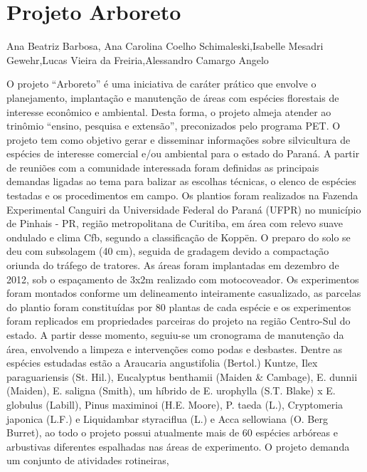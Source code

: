 


\section*{Projeto Arboreto}

Ana Beatriz Barbosa, Ana Carolina Coelho Schimaleski,Isabelle Mesadri Gewehr,Lucas Vieira da Freiria,Alessandro Camargo Angelo

O projeto “Arboreto” é uma iniciativa de caráter prático que envolve o planejamento,
implantação e manutenção de áreas com espécies florestais de interesse econômico e ambiental.
Desta forma, o projeto almeja atender ao trinômio “ensino, pesquisa e extensão”, preconizados
pelo programa PET. O projeto tem como objetivo gerar e disseminar informações sobre
silvicultura de espécies de interesse comercial e/ou ambiental para o estado do Paraná. A partir
de reuniões com a comunidade interessada foram definidas as principais demandas ligadas ao
tema para balizar as escolhas técnicas, o elenco de espécies testadas e os procedimentos em
campo. Os plantios foram realizados na Fazenda Experimental Canguiri da Universidade Federal
do Paraná (UFPR) no município de Pinhais - PR, região metropolitana de Curitiba, em área com
relevo suave ondulado e clima Cfb, segundo a classificação de Koppën. O preparo do solo se deu
com subsolagem (40 cm), seguida de gradagem devido a compactação oriunda do tráfego de
tratores. As áreas foram implantadas em dezembro de 2012, sob o espaçamento de 3x2m
realizado com motocoveador. Os experimentos foram montados conforme um delineamento
inteiramente casualizado, as parcelas do plantio foram constituídas por 80 plantas de cada
espécie e os experimentos foram replicados em propriedades parceiras do projeto na região
Centro-Sul do estado. A partir desse momento, seguiu-se um cronograma de manutenção da
área, envolvendo a limpeza e intervenções como podas e desbastes. Dentre as espécies estudadas
estão a Araucaria angustifolia (Bertol.) Kuntze, Ilex paraguariensis (St. Hil.), Eucalyptus
benthamii (Maiden \& Cambage), E. dunnii (Maiden), E. saligna (Smith), um híbrido de E.
urophylla (S.T. Blake) x E. globulus (Labill), Pinus maximinoi (H.E. Moore), P. taeda (L.),
Cryptomeria japonica (L.F.) e Liquidambar styraciflua (L.) e Acca sellowiana (O. Berg Burret),
ao todo o projeto possui atualmente mais de 60 espécies arbóreas e arbustivas diferentes
espalhadas nas áreas de experimento. O projeto demanda um conjunto de atividades rotineiras,
